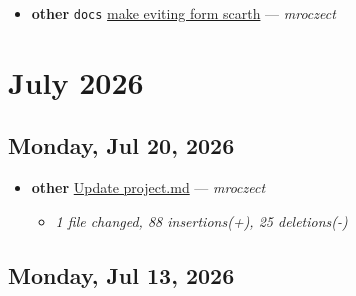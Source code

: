 \begin{itemize}[leftmargin=1.5em]
  \item \textbf{other} \texttt{docs} \href{https://github.com/mroczect/mroczect.github.io/commit/19bd1888eff8e86eaff865482d86b4b5fa74ccfa}{make eviting form scarth} --- \textit{mroczect}
\end{itemize}

\section*{July 2026}

\subsection*{Monday, Jul 20, 2026}

\begin{itemize}[leftmargin=1.5em]
  \item \textbf{other} \href{https://github.com/mroczect/mroczect.github.io/commit/b6cb340e62bc959f87cef6f92c7bbc16de01f550}{Update project.md} --- \textit{mroczect}
  \begin{itemize}[leftmargin=1.5em]
    \item \small\textit{1 file changed, 88 insertions(+), 25 deletions(-)}
  \end{itemize}
\end{itemize}

\subsection*{Monday, Jul 13, 2026}

